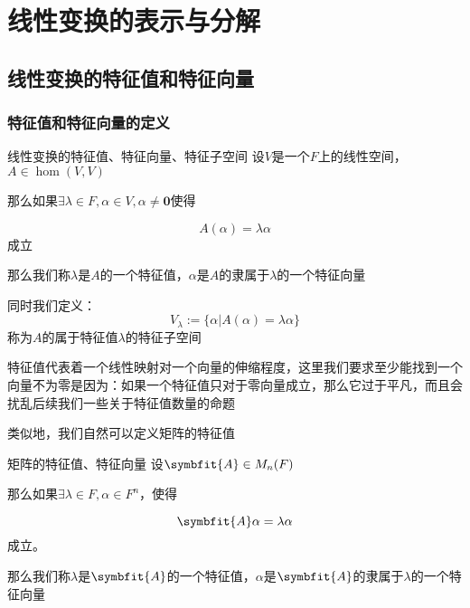 \documentclass[12pt, a4paper, oneside, UTF8]{ctexbook}
\begin{document}
% 
\else
\fi
\chapter{线性变换的表示与分解}
	\section{线性变换的特征值和特征向量}
		\subsection{特征值和特征向量的定义}
			\begin{defn}{线性变换的特征值、特征向量、特征子空间}{}
				设$V$是一个$F$上的线性空间，$A \in \hom(V,V)$

				那么如果$\exists \lambda \in F,\alpha \in V,\alpha \neq \mathbf{0}$使得

				\begin{equation}
					A(\alpha )=\lambda \alpha 
				\end{equation}
				成立

				那么我们称$\lambda $是$A$的一个特征值，$\alpha $是$A$的隶属于$\lambda $的一个特征向量

				同时我们定义：
				\begin{equation}
					V_\lambda := \{\alpha | A(\alpha )=\lambda \alpha \}
				\end{equation}
				称为$A$的属于特征值$\lambda $的特征子空间
			\end{defn}
			特征值代表着一个线性映射对一个向量的伸缩程度，这里我们要求至少能找到一个向量不为零是因为：如果一个特征值只对于零向量成立，那么它过于平凡，而且会扰乱后续我们一些关于特征值数量的命题

			类似地，我们自然可以定义矩阵的特征值
			\begin{defn}{矩阵的特征值、特征向量}{}
				设$\symbfit{A} \in M_n(F)$

				那么如果$\exists \lambda \in F,\alpha \in F^n$，使得

				\begin{equation}
					\symbfit{A}\alpha =\lambda \alpha 
				\end{equation}
				成立。

				那么我们称$\lambda $是$\symbfit{A}$的一个特征值，$\alpha $是$\symbfit{A}$的隶属于$\lambda $的一个特征向量
			\end{defn}
\end{document}
